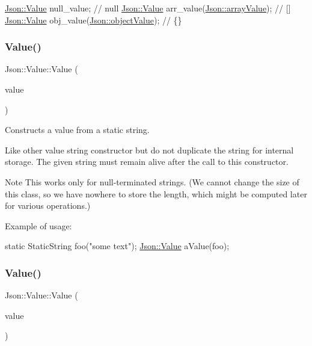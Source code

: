 \begin{DoxyCode}
\hyperlink{classJson_1_1Value}{Json::Value} null\_value; \textcolor{comment}{// null}
\hyperlink{classJson_1_1Value}{Json::Value} arr\_value(\hyperlink{namespaceJson_a7d654b75c16a57007925868e38212b4eadc8f264f36b55b063c78126b335415f4}{Json::arrayValue}); \textcolor{comment}{// []}
\hyperlink{classJson_1_1Value}{Json::Value} obj\_value(\hyperlink{namespaceJson_a7d654b75c16a57007925868e38212b4eae8386dcfc36d1ae897745f7b4f77a1f6}{Json::objectValue}); \textcolor{comment}{// \{\}}
\end{DoxyCode}
 \mbox{\label{classJson_1_1Value_a081830e95f88a37054da7e46c65b0766}} 
\subsubsection{\texorpdfstring{Value()}{Value()}\hspace{0.1cm}{\footnotesize\ttfamily [2/3]}}
{\footnotesize\ttfamily Json\+::\+Value\+::\+Value (\begin{DoxyParamCaption}\item[{const \hyperlink{classJson_1_1StaticString}{Static\+String} \&}]{value }\end{DoxyParamCaption})}



Constructs a value from a static string. 

Like other value string constructor but do not duplicate the string for internal storage. The given string must remain alive after the call to this constructor. \begin{DoxyNote}{Note}
This works only for null-\/terminated strings. (We cannot change the size of this class, so we have nowhere to store the length, which might be computed later for various operations.)
\end{DoxyNote}
Example of usage\+: 
\begin{DoxyCode}
\textcolor{keyword}{static} StaticString foo(\textcolor{stringliteral}{"some text"});
\hyperlink{classJson_1_1Value}{Json::Value} aValue(foo);
\end{DoxyCode}
 \mbox{\label{classJson_1_1Value_a89ef37969ff7c6eb3a7afcca03d4cd4a}} 
\subsubsection{\texorpdfstring{Value()}{Value()}\hspace{0.1cm}{\footnotesize\ttfamily [3/3]}}
{\footnotesize\ttfamily Json\+::\+Value\+::\+Value (\begin{DoxyParamCaption}\item[{const J\+S\+O\+N\+C\+P\+P\+\_\+\+S\+T\+R\+I\+NG \&}]{value }\end{DoxyParamCaption})}

